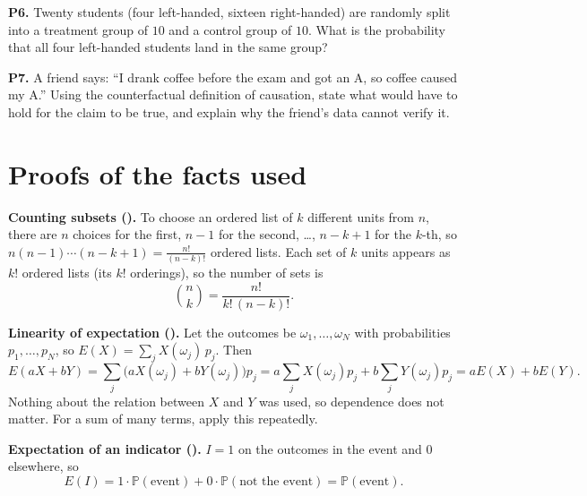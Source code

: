 \documentclass[10pt]{scrartcl}
\begin{document}
\begin{prob}
\textbf{P6.} Twenty students (four left-handed, sixteen right-handed) are randomly split into a treatment group of $10$ and a control group of $10$. What is the probability that all four left-handed students land in the same group?
\end{prob}

\begin{prob}
\textbf{P7.} A friend says: ``I drank coffee before the exam and got an A, so coffee caused my A.'' Using the counterfactual definition of causation, state what would have to hold for the claim to be true, and explain why the friend's data cannot verify it.
\end{prob}

\section{Proofs of the facts used}

\textbf{Counting subsets ().} To choose an ordered list of $k$ different units from $n$, there are $n$ choices for the first, $n-1$ for the second, \dots, $n-k+1$ for the $k$-th, so $n(n-1)\cdots(n-k+1) = \frac{n!}{(n-k)!}$ ordered lists. Each set of $k$ units appears as $k!$ ordered lists (its $k!$ orderings), so the number of sets is
\[
  \binom nk = \frac{n!}{k!\,(n-k)!}.
\]

\textbf{Linearity of expectation ().} Let the outcomes be $\omega_1,\dots,\omega_N$ with probabilities $p_1,\dots,p_N$, so $E(X) = \sum_j X(\omega_j)\,p_j$. Then
\[
  E(aX + bY) = \sum_j \big(aX(\omega_j) + bY(\omega_j)\big)p_j = a\sum_j X(\omega_j)p_j + b\sum_j Y(\omega_j)p_j = aE(X) + bE(Y).
\]
Nothing about the relation between $X$ and $Y$ was used, so dependence does not matter. For a sum of many terms, apply this repeatedly.

\textbf{Expectation of an indicator ().} $I = 1$ on the outcomes in the event and $0$ elsewhere, so
\[
  E(I) = 1\cdot\mathbb P(\text{event}) + 0\cdot\mathbb P(\text{not the event}) = \mathbb P(\text{event}).
\]
\end{document}
